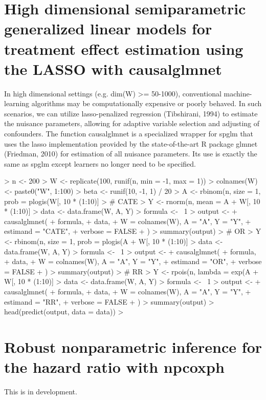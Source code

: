 \documentclass{article}
\begin{document}
\section{High dimensional semiparametric generalized linear models for treatment effect estimation using the LASSO with causalglmnet}
In high dimensional settings (e.g. dim(W) >= 50-1000), conventional machine-learning algorithms may be computationally expensive or poorly behaved. In such scenarios, we can utilize lasso-penalized regression (Tibshirani, 1994) to estimate the nuisance parameters, allowing for adaptive variable selection and adjusting of confounders. The function causalglmnet is a specialized wrapper for spglm that uses the lasso implementation provided by the state-of-the-art R package glmnet (Friedman, 2010) for estimation of all nuisance parameters.\nocite{Friedman2010}\nocite{Tibshirani94regressionshrinkage} Its use is exactly the same as spglm except learners no longer need to be specified.

\begin{Schunk}
\begin{Sinput}
> n <- 200
> W <- replicate(100, runif(n, min = -1, max = 1))
> colnames(W) <- paste0("W", 1:100)
> beta <- runif(10, -1, 1) / 20
> A <- rbinom(n, size = 1, prob = plogis(W[, 10 * (1:10)] %*% beta))
> # CATE
> Y <- rnorm(n, mean = A + W[, 10 * (1:10)] %*% beta, sd = 0.5)
> data <- data.frame(W, A, Y)
> formula <- ~1
> output <-
+   causalglmnet(
+     formula,
+     data,
+     W = colnames(W), A = "A", Y = "Y",
+     estimand = "CATE",
+     verbose = FALSE
+   )
> summary(output)
> # OR
> Y <- rbinom(n, size = 1, prob = plogis(A + W[, 10 * (1:10)] %*% beta))
> data <- data.frame(W, A, Y)
> formula <- ~1
> output <-
+   causalglmnet(
+     formula,
+     data,
+     W = colnames(W), A = "A", Y = "Y",
+     estimand = "OR",
+     verbose = FALSE
+   )
> summary(output)
> # RR
> Y <- rpois(n, lambda = exp(A + W[, 10 * (1:10)] %*% beta))
> data <- data.frame(W, A, Y)
> formula <- ~1
> output <-
+   causalglmnet(
+     formula,
+     data,
+     W = colnames(W), A = "A", Y = "Y",
+     estimand = "RR",
+     verbose = FALSE
+   )
> summary(output)
> head(predict(output, data = data))
> 
\end{Sinput}
\end{Schunk}



\section{Robust nonparametric inference for the hazard ratio with npcoxph}
This is in development. \nocite{vanderLaanetal2007}



\end{document}
